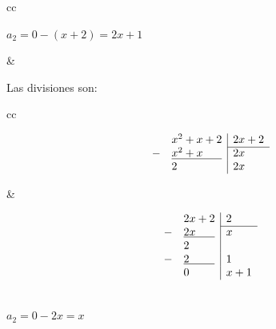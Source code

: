\begin{ejs}
\begin{center}
\begin{tabular}{cc}
\begin{minipage}[t]{0.4\textwidth}
                    \vspace{1.5em}
                    $ a_2 = 0 - (x+2) = 2x + 1$
                \end{minipage}
                &
                \begin{minipage}[t]{0.4\textwidth}
                    \vspace{0.1em}
                    \centering
                    Las divisiones son:\\
                    \vspace{-0.5em}
                    \hspace{-4.7em}
                    \begin{tabular}{cc}
                        \begin{minipage}[t]{0.52\textwidth}
                            \[
                                \begin{array}{rl|l}
                                    &x^2 +x + 2& 2x +2\\\cline{3-3} 
                                    - & \underline{x^2 + x\phantom{ m...}} & 2x\\
                                    &2& 2x
                                \end{array}
                            \]
                        \end{minipage}
                        &\hspace{1em}
                        \begin{minipage}[t]{0.22\textwidth}
                            \[
                                \begin{array}{rl|l}
                                    &2x +2& 2\\\cline{3-3} 
                                    - & \underline{2x\phantom{ m...}} & x\\
                                    &2& \\
                                    - & \underline{2\phantom{ m.....}} & 1\\
                                    &0& x + 1 
                                \end{array}
                            \]
                        \end{minipage}
                    \end{tabular}\\
                    \vspace{1.5em}
                    $a_2 = 0 - 2x = x $

\end{minipage}
\end{tabular}
\end{center}
\end{ejs}
